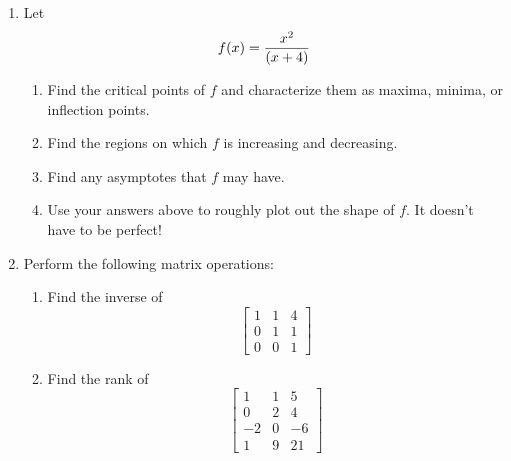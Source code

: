 \documentclass[11pt]{article}
\begin{document}
\begin{enumerate}
\vspace{.2in}
\item Let $$f(x)={{x^2}\over{(x+4)}}$$
\begin{enumerate}
\item Find the critical points of $f$ and characterize them as maxima, minima, or inflection points.
\item Find the regions on which $f$ is increasing and decreasing.
\item Find any asymptotes that $f$ may have.
\item Use your answers above to roughly plot out the shape of $f$.  It doesn't have to be perfect!

 
\end{enumerate}

\newpage

\item Perform the following matrix operations:

\begin{enumerate}
\item Find the inverse of $$\begin{bmatrix}1 & 1& 4\\ 0& 1& 1\\0&0&1
\end{bmatrix}$$

\item Find the rank of 
$$\begin{bmatrix} 
1& 1& 5\\
0& 2& 4\\
-2& 0& -6\\
1& 9& 21
\end{bmatrix}$$




\end{enumerate}
\end{enumerate}
\end{document}
